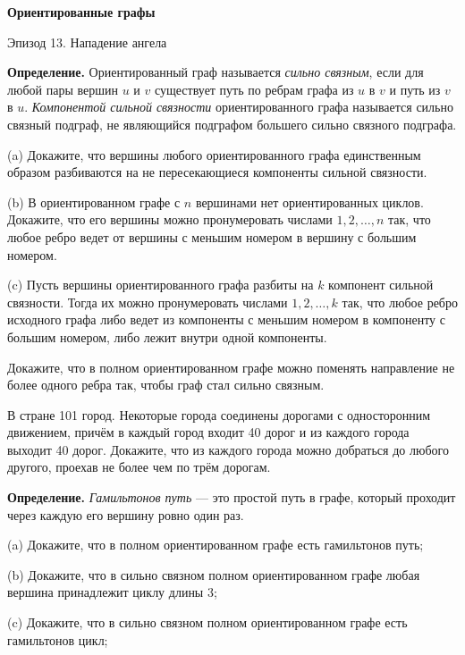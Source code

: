 \centerline{\bf \Huge Ориентированные графы}

\begin{flushright}
        \scriptsize{Эпизод 13. Нападение ангела}
\end{flushright}

\textbf{Определение.} Ориентированный граф называется \textit{сильно связным}, если для любой пары вершин $u$ и $v$ существует путь по ребрам графа из $u$ в $v$ и путь из $v$ в $u$. \textit{Компонентой сильной связности} ориентированного графа называется сильно связный подграф, не являющийся подграфом большего сильно связного подграфа.

(a) Докажите, что вершины любого ориентированного графа единственным образом разбиваются на не пересекающиеся компоненты сильной связности.

\noindent
(b) В ориентированном графе с $n$ вершинами нет ориентированных циклов. Докажите, что его вершины можно пронумеровать числами $1,2, \ldots, n$ так, что любое ребро ведет от вершины с меньшим номером в вершину с большим номером.

\noindent
(c) Пусть вершины ориентированного графа разбиты на $k$ компонент сильной связности. Тогда их можно пронумеровать числами $1,2, \ldots, k$ так, что любое ребро исходного графа либо ведет из компоненты с меньшим номером в компоненту с большим номером, либо лежит внутри одной компоненты.

Докажите, что в полном ориентированном графе можно поменять направление не более одного ребра так, чтобы граф стал сильно связным.

В стране 101 город. Некоторые города соединены дорогами с односторонним движением, причём в каждый город входит 40 дорог и из каждого города выходит 40 дорог. Докажите, что из каждого города можно добраться до любого другого, проехав не более чем по трём дорогам.

\textbf{Определение.}
\textit{Гамильтонов путь} --- это простой путь в графе, который проходит через каждую его вершину ровно один раз.

(a) Докажите, что в полном ориентированном графе есть гамильтонов путь;

\noindent
(b) Докажите, что в сильно связном полном ориентированном графе любая вершина принадлежит циклу длины 3;

\newpage

\hspace{3mm}

\noindent
(c) Докажите, что в сильно связном полном ориентированном графе есть гамильтонов цикл;

